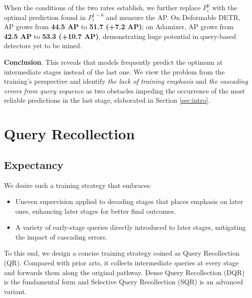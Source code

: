 \documentclass[10pt,twocolumn,letterpaper]{article}
\begin{document}
When the conditions of the two rates establish, we further replace $P_i^6$ with the optimal prediction found in $P_i^{1\sim 6}$ and measure the AP. On Deformable DETR, AP grows from \textbf{44.5 AP} to \textbf{51.7 (+7.2 AP)}; on Adamixer, AP grows from \textbf{42.5 AP} to \textbf{53.3 (+10.7 AP)}, demonstrating huge potential in query-based detectors yet to be mined.  

\textbf{Conclusion}. This reveals that models frequently predict the optimum at intermediate stages instead of the last one. We view the problem from the training's perspective and identify \textit{the lack of training emphasis} and \textit{the cascading errors from query sequence} as two obstacles impeding the occurrence of the most reliable predictions in the last stage, elaborated in Section \ref{sec:intro}.

















\section{Query Recollection}
\label{sec:QR}

\subsection{Expectancy}
We desire such a training strategy that embraces:
\begin{itemize}
    \item Uneven supervision applied to decoding stages that places emphasis on later ones, enhancing later stages for better final outcomes.
    \item A variety of early-stage queries directly introduced to later stages, mitigating the impact of cascading errors.
\end{itemize}



To this end, we design a concise training strategy coined as Query Recollection (QR). Compared with prior arts, it collects intermediate queries at every stage and forwards them along the original pathway. Dense Query Recollection (DQR) is the fundamental form and Selective Query Recollection (SQR) is an advanced variant. 
\end{document}
